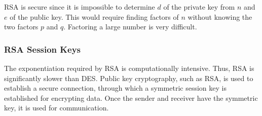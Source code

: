 RSA is secure since it is impossible to determine \(d\) of the private key from \(n\) and \(e\) of the public key.
This would require finding factors of \(n\) without knowing the two factors \(p\) and \(q\).
Factoring a large number is very difficult.

\subsubsection{RSA Session Keys}

The exponentiation required by RSA is computationally intensive.
Thus, RSA is significantly slower than DES\@.
Public key cryptography, such as RSA, is used to establish a secure connection, through which a symmetric session key is established for encrypting data.
Once the sender and receiver have the symmetric key, it is used for communication.
